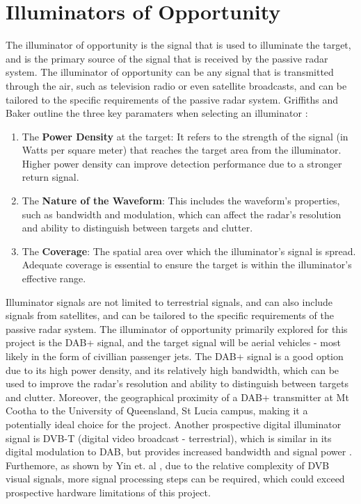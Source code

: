 \section{Illuminators of Opportunity}
The illuminator of opportunity is the signal that is used to illuminate the target, and is the primary source of the signal that is received by the passive radar system. The illuminator of opportunity can be any signal that is transmitted through the air, such as television radio or even satellite broadcasts, and can be tailored to the specific requirements of the passive radar system. Griffiths and Baker outline the three key paramaters when selecting an illuminator \cite{INTRO2017}:
\begin{enumerate}[label=\arabic*.]
    \item The \textbf{Power Density} at the target: It refers to the strength of the signal (in Watts per square meter) that reaches the target area from the illuminator. Higher power density can improve detection performance due to a stronger return signal.
    \item The \textbf{Nature of the Waveform}: This includes the waveform's properties, such as bandwidth and modulation, which can affect the radar's resolution and ability to distinguish between targets and clutter.
    \item The \textbf{Coverage}: The spatial area over which the illuminator's signal is spread. Adequate coverage is essential to ensure the target is within the illuminator's effective range.
\end{enumerate}

Illuminator signals are not limited to terrestrial signals, and can also include signals from satellites, and can be tailored to the specific requirements of the passive radar system. The illuminator of opportunity primarily explored for this project is the DAB+ signal, and the target signal will be aerial vehicles - most likely in the form of civillian passenger jets. The DAB+ signal is a good option due to its high power density, and its relatively high bandwidth, which can be used to improve the radar's resolution and ability to distinguish between targets and clutter. Moreover, the geographical proximity of a DAB+ transmitter at Mt Cootha to the University of Queensland, St Lucia campus, making it a potentially ideal choice for the project. Another prospective digital illuminator signal is DVB-T (digital video broadcast - terrestrial), which is similar in its digital modulation to DAB, but provides increased bandwidth and signal power \cite{DVBsignal}. Furthemore, as shown by Yin et. al \cite{DVBnoise}, due to the relative complexity of  DVB visual signals, more signal processing steps can be required, which could exceed prospective hardware limitations of this project.

